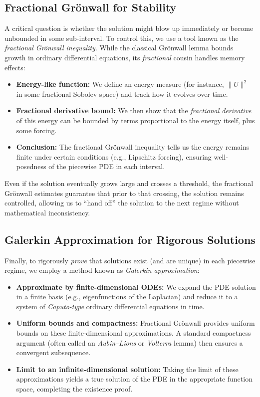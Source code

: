 \documentclass[12pt]{article}
\begin{document}
\subsection{Fractional Gr\"onwall for Stability}
A critical question is whether the solution might blow up immediately or become
unbounded in some sub-interval. To control this, we use a tool known as the
\emph{fractional Grönwall inequality}. While the classical Grönwall lemma
bounds growth in ordinary differential equations, its \emph{fractional} cousin
handles memory effects:

\begin{itemize}
    \item \textbf{Energy-like function:} We define an energy measure
          (for instance, $\|U\|^2$ in some fractional Sobolev space) and track
          how it evolves over time.
    \item \textbf{Fractional derivative bound:} We then show that the 
          \emph{fractional derivative} of this energy can be bounded by terms
          proportional to the energy itself, plus some forcing. 
    \item \textbf{Conclusion:} The fractional Grönwall inequality tells us the
          energy remains finite under certain conditions (e.g., Lipschitz
          forcing), ensuring well-posedness of the piecewise PDE in each 
          interval.
\end{itemize}

\noindent
Even if the solution eventually grows large and crosses a threshold, the 
fractional Grönwall estimates guarantee that prior to that crossing, the 
solution remains controlled, allowing us to “hand off” the solution to the next 
regime without mathematical inconsistency.

\subsection{Galerkin Approximation for Rigorous Solutions}
Finally, to rigorously \emph{prove} that solutions exist (and are unique) in each
piecewise regime, we employ a method known as \emph{Galerkin approximation}:

\begin{itemize}
    \item \textbf{Approximate by finite-dimensional ODEs:} We expand the PDE
          solution in a finite basis (e.g., eigenfunctions of the Laplacian)
          and reduce it to a system of \emph{Caputo-type} ordinary differential
          equations in time. 
    \item \textbf{Uniform bounds and compactness:} Fractional Grönwall provides
          uniform bounds on these finite-dimensional approximations. A standard
          compactness argument (often called an \emph{Aubin--Lions} or
          \emph{Volterra} lemma) then ensures a convergent subsequence.
    \item \textbf{Limit to an infinite-dimensional solution:} Taking the limit
          of these approximations yields a true solution of the PDE in the
          appropriate function space, completing the existence proof.
\end{itemize}
\end{document}
